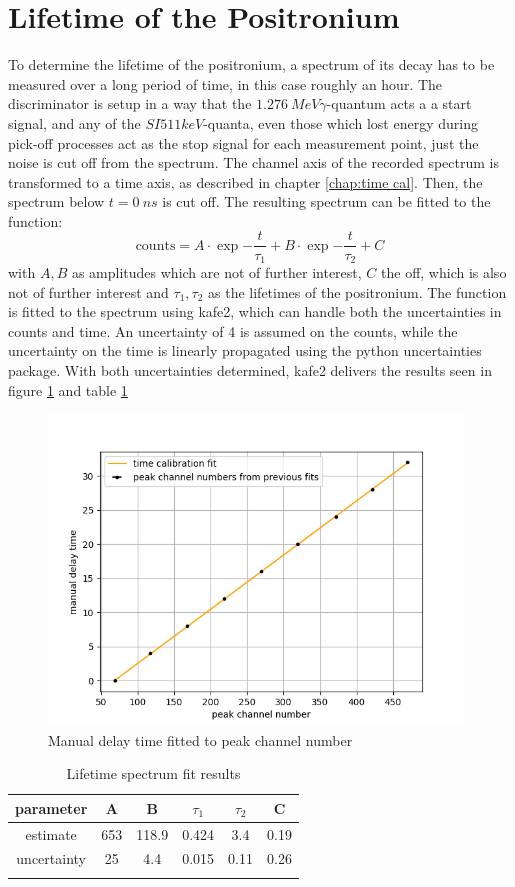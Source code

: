 \section{Lifetime of the Positronium}

To determine the lifetime of the positronium, a spectrum of its decay has to be measured over a long period of time, in this case roughly an hour. The discriminator is setup in a way that the $\SI{1.276}{MeV} \gamma$-quantum acts a a start signal, and any of the $SI{511}{keV}$-quanta, even those which lost energy during pick-off processes act as the stop signal for each measurement point, just the noise is cut off from the spectrum. 
The channel axis of the recorded spectrum is transformed to a time axis, as described in chapter \ref{chap:time cal}. Then, the spectrum below $t = \SI{0}{ns}$ is cut off. The resulting spectrum can be fitted to the function: 
$$\mathrm{counts} = A\cdot\exp{-\frac{t}{\tau_1}}+ B\cdot\exp{-\frac{t}{\tau_2}} + C $$
with $A,B$ as amplitudes which are not of further interest, $C$ the off, which is also not of further interest and $\tau_1, \tau_2$ as the lifetimes of the positronium.
The function is fitted to the spectrum using kafe2, which can handle both the uncertainties in counts and time. An uncertainty of 4 is assumed on the counts, while the uncertainty on the time is linearly propagated using the python uncertainties package. With both uncertainties determined, kafe2 delivers the results seen in figure \ref{} and table \ref{}


\begin{figure}[]
    \centering
    \includegraphics[width=110mm,scale=0.5]{Positronium/include/timecalfit.png}
    \caption{Manual delay time fitted to peak channel number} 
    \label{fig:timecalfit}
\end{figure}

\begin{table}[]
    \centering
    \caption{Lifetime spectrum fit results}
    \begin{tabular}{cccccc}
         parameter & A& B & $\tau_1$ & $\tau_2$ & C\\ \hline
         estimate & 653 & 118.9 & 0.424 & 3.4 & 0.19\\
         uncertainty & 25 & 4.4& 0.015& 0.11& 0.26 \\\hline \\
    \end{tabular}
    \label{tab:lifetime }
\end{table}